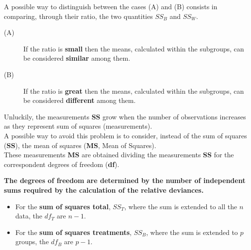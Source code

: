 \begin{frame}
  \vspace*{.25cm}
  A possible way to distinguish between the cases (A) and (B) consists in comparing, through their ratio, the two quantities {\boldmath$SS_B$} and {\boldmath$SS_W$}.
  \vspace*{.5cm}
  \hspace*{-.5cm}
  \begin{description}
    \item[(A)] If the ratio is \textbf{small} then the means, calculated within the subgroups, can be considered \textbf{similar} among them.
    \vspace*{.5cm}
    \item[(B)] If the ratio is \textbf{great} then the means, calculated within the subgroups, can be considered \textbf{different} among them.
  \end{description}
\end{frame}

\begin{frame}
  \vspace*{.25cm}
  Unluckily, the measurements \textbf{SS} grow when the number of observations increases as they represent sum of squares (measurements).\\
  \vspace*{.5cm}
  A possible way to avoid this problem is to consider, instead of the sum of squares (\textbf{SS}), the mean of squares (\textbf{MS}, Mean of Squares).\\
  \vspace*{.5cm}
  These measurements \textbf{MS} are obtained dividing the measurements \textbf{SS} for the correspondent degrees of freedom (\textbf{df}).
\end{frame}

\begin{frame}
  \vspace*{.5cm}
  \textbf{The degrees of freedom are determined by the number of independent sums required by the calculation of the relative deviances.}
  \vspace*{.5cm}
  \begin{itemize}
    \item For the \textbf{sum of squares total}, {\boldmath$SS_T$}, where the sum is extended to all the $ n $ data, the {\boldmath$df_T$} are {\boldmath $ n-1 $}.
    \vspace*{.5cm}
    \item For the \textbf{sum of squares treatments}, {\boldmath$SS_B$}, where the sum is extended to $ p $ groups, the {\boldmath$df_B$} are {\boldmath $ p-1 $}.
  \end{itemize}
\end{frame}

